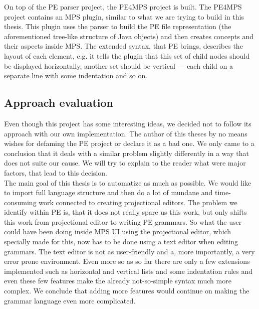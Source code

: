 On top of the PE parser project, the PE4MPS project is built.
The PE4MPS project contains an MPS plugin, similar to what we are trying to build in this thesis.
This plugin uses the parser to build the PE file representation (the aforementioned tree-like structure of Java objects) and then creates concepts and their aspects inside MPS.
The extended syntax, that PE brings, describes the layout of each element, e.g. it tells the plugin that this set of child nodes should be displayed horizontally, another set should be vertical --- each child on a separate line with some indentation and so on.

\subsection{Approach evaluation}
Even though this project has some interesting ideas, we decided not to follow its approach with our own implementation.
The author of this theses by no means wishes for defaming the PE project or declare it as a bad one.
We only came to a conclusion that it deals with a similar problem slightly differently in a way that does not suite our cause.
We will try to explain to the reader what were major factors, that lead to this decision.
\\

The main goal of this thesis is to automatize as much as possible.
We would like to import full language structure and then do a lot of mundane and time-consuming work connected to creating projectional editors.
The problem we identify within PE is, that it does not really spare us this work, but only shifts this work from projectional editor to writing PE grammars.
So what the user could have been doing inside MPS UI using the projectional editor, which specially made for this, now has to be done using a text editor when editing grammars.
The text editor is not as user-friendly and a, more importantly, a very error prone environment.
Even more so as so far there are only a few extensions implemented such as horizontal and vertical lists and some indentation rules and even these few features make the already not-so-simple syntax much more complex.
We conclude that adding more features would continue on making the grammar language even more complicated.
\\

